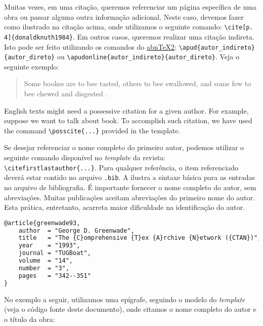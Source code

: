 \documentclass{textolivre}
\begin{document}
Muitas vezes, em uma citação, queremos referenciar um página específica de uma obra ou passar
alguma outra informação adicional. 
Neste caso, devemos fazer como ilustrado na citação acima, onde utilizamos o seguinte comando: \verb|\cite[p. 4]{donaldknuth1984}|.
Em outros casos, queremos realizar uma citação indireta. Isto pode ser feito utilizando os 
comandos do \href{https://github.com/abntex/abntex2}{abnTeX2}: \verb|\apud{autor_indireto}{autor_direto}| ou \verb|\apudonline{autor_indireto}{autor_direto}|.
Veja o seguinte exemplo: 
\begin{quote}
Some bookes are to bee tasted,
others to bee swallowed,
and some few to bee chewed and disgested .
\end{quote}

\begin{english}
English texts might need a possessive citation for a given author. For example,
suppose we want to talk about  book. To accomplish such citation, we have used the command \verb|\posscite{...}|
provided in the template.
\end{english}

Se desejar referenciar o nome completo do primeiro autor, podemos utilizar o seguinte comando disponível no \emph{template} da revista: \verb|\citefirstlastauthor{...}|.
Para qualquer referência, o item referenciado deverá estar contido no arquivo \texttt{.bib}. A  ilustra a sintaxe básica para 
as entradas no arquivo de bibliografia. É importante fornecer o nome completo do autor, sem abreviações. 
Muitas publicações aceitam abreviações do primeiro nome do autor. Esta prática, entretanto, acarreta maior 
dificuldade na identificação do autor.

\begin{lstlisting}[language=tex, label=lst-bib, caption={Estrutura básica de uma entrada no arquivo de bibliografia.}, source={\LaTeX{} Wikibook (\url{https://en.wikibooks.org/wiki/LaTeX/Bibliography_Management}).}]
@article{greenwade93,
    author  = "George D. Greenwade",
    title   = "The {C}omprehensive {T}ex {A}rchive {N}etwork ({CTAN})",
    year    = "1993",
    journal = "TUGBoat",
    volume  = "14",
    number  = "3",
    pages   = "342--351"
}
\end{lstlisting} %

No exemplo a seguir, utilizamos uma epígrafe, seguindo o modelo do \emph{template} (veja o código fonte deste documento), 
onde citamos o nome completo do autor e o título da obra:
\end{document}
